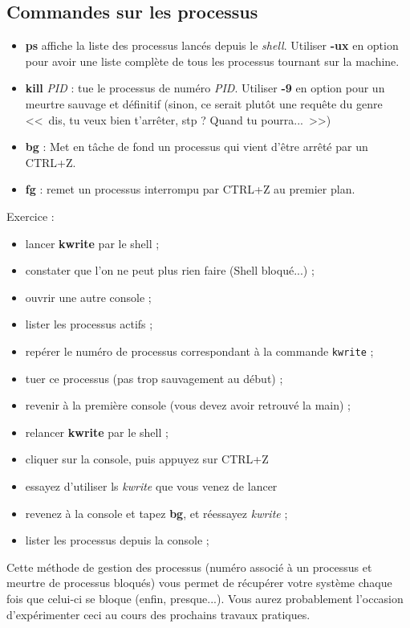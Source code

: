 \documentclass[12pt,a4paper]{article}
\begin{document}
\subsection{Commandes sur les processus}
\begin{itemize}
\item \textbf{ps} affiche la liste des processus lancés depuis le
  \textit{shell}. Utiliser \textbf{-ux} en option pour avoir une liste
  complète de tous les processus tournant sur la machine. 
\item \textbf{kill} \textit{PID} : tue le processus de numéro
  \textit{PID}. Utiliser \textbf{-9} en option pour un meurtre sauvage et
  définitif (sinon, ce serait plutôt une requête du genre <<~dis, tu
  veux bien t'arrêter, stp ? Quand tu pourra...~>>)
\item \textbf{bg} : Met en tâche de fond un processus qui vient d'être
  arrêté par un CTRL+Z.
\item \textbf{fg} : remet un processus interrompu par CTRL+Z au
  premier plan.
\end{itemize}

Exercice :
\begin{itemize}
\item lancer \textbf{kwrite} par le shell ;
\item constater que l'on ne peut plus rien faire (Shell bloqué...) ;
\item ouvrir une autre console ;
\item lister les processus actifs ;
\item repérer le numéro de processus correspondant à la commande
  \texttt{kwrite} ;
\item tuer ce processus (pas trop sauvagement au début) ;
\item revenir à la première console (vous devez avoir retrouvé la
  main) ;
\item relancer \textbf{kwrite} par le shell ;
\item cliquer sur la console, puis appuyez sur CTRL+Z
\item essayez d'utiliser ls \textit{kwrite} que vous venez de lancer
\item revenez à la console et tapez \textbf{bg}, et réessayez
  \textit{kwrite} ;
\item lister les processus depuis la console ;
\end{itemize}




Cette méthode de gestion des processus (numéro associé à un processus
et meurtre de processus bloqués) vous permet de récupérer votre
système chaque fois que celui-ci se bloque (enfin, presque...). Vous
aurez probablement l'occasion d'expérimenter ceci au cours des
prochains travaux pratiques.
\end{document}
